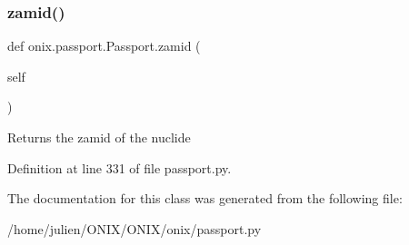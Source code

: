 \mbox{\label{classonix_1_1passport_1_1Passport_a5ec6485dc7b69d0373b798bbf2b7ba47}} 
\subsubsection{\texorpdfstring{zamid()}{zamid()}}
{\footnotesize\ttfamily def onix.\+passport.\+Passport.\+zamid (\begin{DoxyParamCaption}\item[{}]{self }\end{DoxyParamCaption})}

\begin{DoxyVerb}Returns the zamid of the nuclide\end{DoxyVerb}
 

Definition at line 331 of file passport.\+py.



The documentation for this class was generated from the following file\+:\begin{DoxyCompactItemize}
\item 
/home/julien/\+O\+N\+I\+X/\+O\+N\+I\+X/onix/passport.\+py\end{DoxyCompactItemize}
